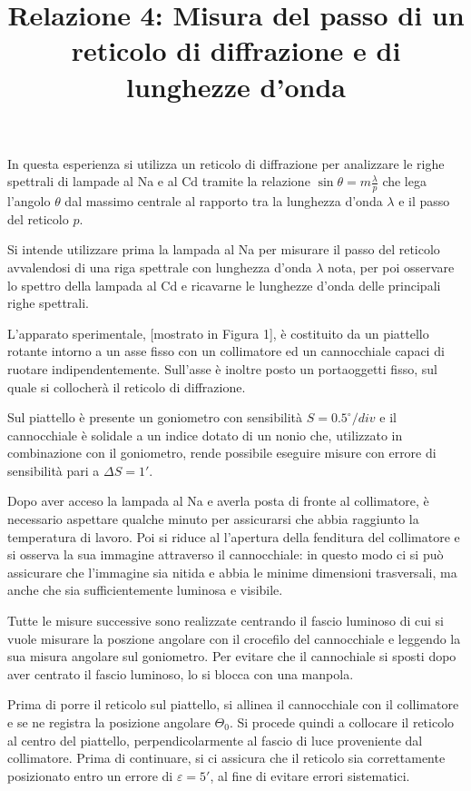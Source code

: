\documentclass{article}
\title{Relazione 4: Misura del passo di un reticolo di diffrazione
	e di lunghezze d'onda}
\date{}
\begin{document}
	\maketitle
	
	
	In questa esperienza si utilizza un reticolo di diffrazione per analizzare le righe spettrali di lampade al Na e al Cd tramite la relazione $\sin{\theta}=m\frac{\lambda}{p}$ che lega l'angolo $\theta$ dal massimo centrale al rapporto tra la lunghezza d'onda $\lambda$ e il passo del reticolo $p$. 
	
	Si intende utilizzare prima la lampada al Na per misurare il passo del reticolo avvalendosi di una riga spettrale con lunghezza d'onda $\lambda$ nota, per poi osservare lo spettro della lampada al Cd e ricavarne le lunghezze d'onda delle principali righe spettrali.
	
	L'apparato sperimentale, [mostrato in Figura 1], è costituito da un piattello rotante intorno a un asse fisso con un collimatore ed un cannocchiale capaci di ruotare indipendentemente. Sull'asse è inoltre posto un portaoggetti fisso, sul quale si collocherà il reticolo di diffrazione.
	
	Sul piattello è presente un goniometro con sensibilità $S=0.5^{\circ} / div$ e il cannocchiale è solidale a un indice dotato di un nonio che, utilizzato in combinazione con il goniometro, rende possibile eseguire misure con errore di sensibilità pari a $\Delta S = 1'$.

 Dopo aver acceso la lampada al Na e averla posta di fronte al collimatore, è necessario aspettare qualche minuto per assicurarsi che abbia raggiunto la temperatura di lavoro. Poi si riduce al l'apertura della fenditura del collimatore e si osserva la sua immagine attraverso il cannocchiale: in questo modo ci si può assicurare che l'immagine sia nitida e abbia le minime dimensioni trasversali, ma anche che sia sufficientemente luminosa e visibile.

Tutte le misure successive sono realizzate centrando il fascio luminoso di cui si vuole misurare la poszione angolare con il crocefilo del cannocchiale e leggendo la sua misura angolare sul goniometro. Per evitare che il cannochiale si sposti dopo aver centrato il fascio luminoso, lo si blocca con una manpola.

Prima di porre il reticolo sul piattello, si allinea il cannocchiale con il collimatore e se ne registra la posizione angolare $\Theta_0$. Si procede quindi a collocare il reticolo al centro del piattello, perpendicolarmente al fascio di luce proveniente dal collimatore. Prima di continuare, si ci assicura che il reticolo sia correttamente posizionato entro un errore di $\varepsilon = 5'$, al fine di evitare errori sistematici.
\end{document}
